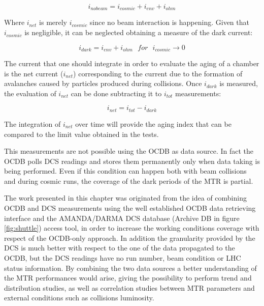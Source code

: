 \begin{equation}
\label{eq:no_beam}
i_{no beam}=i_{cosmic}+i_{env}+i_{ohm}
\end{equation}

Where $i_{net}$ is merely $i_{cosmic}$ since no beam interaction is happening.
Given that $i_{cosmic}$ is negligible, it can be neglected obtaining a measure of the dark current:

\begin{equation}
\label{eq:idark}
i_{dark}=i_{env}+i_{ohm}\ \ \ for\ \ \ i_{cosmic}\rightarrow0
\end{equation}

The current that one should integrate in order to evaluate the aging of a chamber is the net current ($i_{net}$) corresponding to the current due to the formation of avalanches caused by particles produced during collisions.
Once $i_{dark}$ is measured, the evaluation of $i_{net}$ can be done subtracting it to $i_{tot}$ measurements:

\begin{equation}
\label{eq:inet}
i_{net}=i_{tot}-i_{dark}
\end{equation}

The integration of $i_{net}$ over time will provide the aging index that can be compared to the limit value obtained in the tests.

This measurements are not possible using the OCDB as data source.
In fact the OCDB polls DCS readings and stores them permanently only when data taking is being performed.
Even if this condition can happen both with beam collisions and during cosmic runs, the coverage of the dark periods of the MTR is partial.

The work presented in this chapter was originated from the idea of combining OCDB and DCS measurements using the well established OCDB data retrieving interface and the AMANDA/DARMA DCS database (Archive DB in figure \ref{fig:shuttle}) access tool, in order to increase the working conditions coverage with respect of the OCDB-only approach.
In addition the granularity provided by the DCS is much better with respect to the one of the data propagated to the OCDB, but the DCS readings have no run number, beam condition or LHC status information.
By combining the two data sources a better understanding of the MTR performances would arise, giving the possibility to perform trend and distribution studies, as well as correlation studies between MTR parameters and external conditions such as collisions luminosity.

